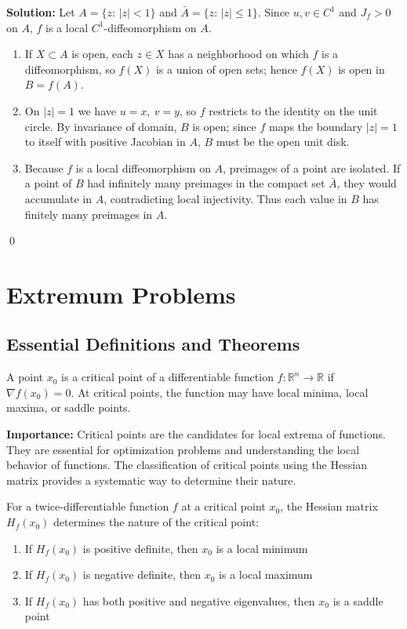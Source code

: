 \bigskip\noindent\textbf{Solution:}
Let $A=\{z:\,|z|<1\}$ and $\bar A=\{z:\,|z|\le 1\}$. Since $u,v\in C^1$ and $J_f>0$ on $A$, $f$ is a local $C^1$-diffeomorphism on $A$.
\begin{enumerate}[label=(\alph*)]
    \item If $X\subset A$ is open, each $z\in X$ has a neighborhood on which $f$ is a diffeomorphism, so $f(X)$ is a union of open sets; hence $f(X)$ is open in $B=f(A)$.
    \item On $|z|=1$ we have $u=x,\ v=y$, so $f$ restricts to the identity on the unit circle. By invariance of domain, $B$ is open; since $f$ maps the boundary $|z|=1$ to itself with positive Jacobian in $A$, $B$ must be the open unit disk.
    \item Because $f$ is a local diffeomorphism on $A$, preimages of a point are isolated. If a point of $B$ had infinitely many preimages in the compact set $\bar A$, they would accumulate in $A$, contradicting local injectivity. Thus each value in $B$ has finitely many preimages in $A$.
\end{enumerate}\qed
\section{Extremum Problems}

\subsection*{Essential Definitions and Theorems}

\begin{definition}
A point $x_0$ is a critical point of a differentiable function $f: \mathbb{R}^n \to \mathbb{R}$ if $\nabla f(x_0) = 0$. At critical points, the function may have local minima, local maxima, or saddle points.
\end{definition}

\noindent\textbf{Importance:} Critical points are the candidates for local extrema of functions. They are essential for optimization problems and understanding the local behavior of functions. The classification of critical points using the Hessian matrix provides a systematic way to determine their nature.



\begin{definition}
For a twice-differentiable function $f$ at a critical point $x_0$, the Hessian matrix $H_f(x_0)$ determines the nature of the critical point:
\begin{enumerate}[label=(\alph*)]
\item If $H_f(x_0)$ is positive definite, then $x_0$ is a local minimum
\item If $H_f(x_0)$ is negative definite, then $x_0$ is a local maximum
\item If $H_f(x_0)$ has both positive and negative eigenvalues, then $x_0$ is a saddle point
\end{enumerate}
\end{definition}

